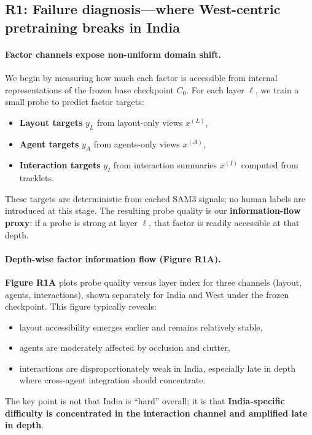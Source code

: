 \subsection{R1: Failure diagnosis---where West-centric pretraining breaks in India}
\label{sec:r1_failure_diagnosis}

\paragraph{Factor channels expose non-uniform domain shift.}
We begin by measuring how much each factor is accessible from internal representations of the frozen base checkpoint $C_0$. For each layer $\ell$, we train a small probe to predict factor targets:
\begin{itemize}[leftmargin=*,itemsep=2pt]
\item \textbf{Layout targets} $y_L$ from layout-only views $x^{(L)}$,
\item \textbf{Agent targets} $y_A$ from agents-only views $x^{(A)}$,
\item \textbf{Interaction targets} $y_I$ from interaction summaries $x^{(I)}$ computed from tracklets.
\end{itemize}
These targets are deterministic from cached SAM3 signals; no human labels are introduced at this stage. The resulting probe quality is our \textbf{information-flow proxy}: if a probe is strong at layer $\ell$, that factor is readily accessible at that depth.

\vspace{4pt}
\paragraph{Depth-wise factor information flow (Figure R1A).}
\textbf{Figure R1A} plots probe quality versus layer index for three channels (layout, agents, interactions), shown separately for India and West under the frozen checkpoint. This figure typically reveals:
\begin{itemize}[leftmargin=*,itemsep=2pt]
\item layout accessibility emerges earlier and remains relatively stable,
\item agents are moderately affected by occlusion and clutter,
\item interactions are disproportionately weak in India, especially late in depth where cross-agent integration should concentrate.
\end{itemize}
The key point is not that India is ``hard'' overall; it is that \textbf{India-specific difficulty is concentrated in the interaction channel and amplified late in depth}.

